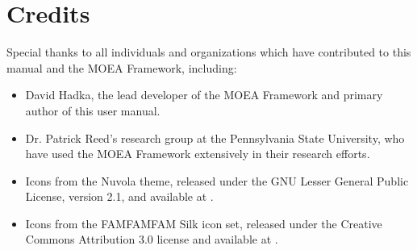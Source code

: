 %
%

\chapter{Credits}

Special thanks to all individuals and organizations which have contributed to this manual and the MOEA Framework, including:

\begin{itemize}
  \item David Hadka, the lead developer of the MOEA Framework and primary author of this user manual.
  \item Dr. Patrick Reed's research group at the Pennsylvania State University, who have used the MOEA Framework extensively in their research efforts.
  \item Icons from the Nuvola theme, released under the GNU Lesser General Public License, version 2.1, and available at .
  \item Icons from the FAMFAMFAM Silk icon set, released under the Creative Commons Attribution 3.0 license and available at .
\end{itemize}
